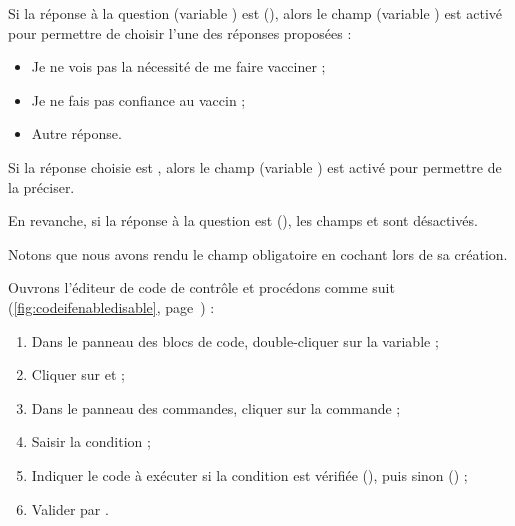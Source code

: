 \begin{tcolorbox}[title=Description de la logique, drop small lifted shadow=black]

Si la réponse à la question  (variable ) est  (),\newline
alors le champ  (variable ) est activé pour permettre de choisir l'une des réponses proposées :
\begin{itemize}
	\item Je ne vois pas la nécessité de me faire vacciner ;
	\item Je ne fais pas confiance au vaccin ;
	\item Autre réponse.
\end{itemize}

Si la réponse choisie est , alors le champ  (variable ) est activé pour permettre de la préciser.

En revanche, si la réponse à la question  est  (), les champs  et  sont désactivés.

Notons que nous avons rendu le champ  obligatoire en cochant  lors de sa création.
\end{tcolorbox}

Ouvrons l'éditeur de code de contrôle et procédons comme suit (\autoref{fig:codeifenabledisable}, page~\pageref{fig:codeifenabledisable}) :

\begin{enumerate}
	\item Dans le panneau des blocs de code, double-cliquer sur la variable  ;
	\item Cliquer sur  et  ;
	\item Dans le panneau des commandes, cliquer sur la commande  ;
	\item Saisir la condition ;
	\item Indiquer le code à exécuter si la condition est vérifiée (), puis sinon () ;
	\item Valider par .
\end{enumerate}


